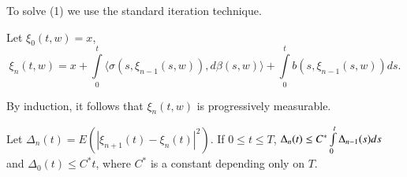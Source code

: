 To solve (1) we use the standard iteration technique.

\setcounter{step}{0}
\begin{step}%
Let $\xi_{0}(t,w)=x$,
$$
\xi_{n}(t,w)=x+\int\limits^{t}_{0}\langle
\sigma(s,\xi_{n-1}(s,w)),d\beta(s,w)\rangle
+\int\limits^{t}_{0}b(s,\xi_{n-1}(s,w))ds. 
$$

By induction, it follows that $\xi_{n}(t,w)$ is progressively measurable.
\end{step}

\begin{step}%
Let $\Delta_{n}(t)=E(|\xi_{n+1}(t)-\xi_{n}(t)|^{2})$. If $0\leq t\leq
T$, $\Delta_{n}(t)\leq C^{*}\int\limits^{t}_{0}\Delta_{n-1}\break (s)ds$ and
$\Delta_{0}(t)\leq C^{*}t$, where $C^{*}$ is a constant depending only
on $T$.
\end{step}

